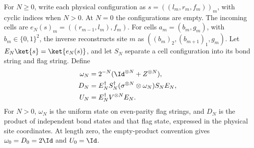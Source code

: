 \begin{definition}%
    \label{def:mpdo_twisted_dimer_bond_flag_regrouping}
    \leanok
    For $N\ge0$, write each physical configuration as
    $s=((l_m,r_m,f_m))_m$, with cyclic indices when $N>0$.
    At $N=0$ the configurations are empty. The incoming cells are
    $e_N(s)_m=((r_{m-1},l_m),f_m)$.
    For cells $a_m=(b_m,g_m)$, with $b_m\in\{0,1\}^2$, the inverse
    reconstructs site $m$ as $((b_m)_2,(b_{m+1})_1,g_m)$.
    Let $E_N\ket{s}=\ket{e_N(s)}$, and let $S_N$ separate a cell
    configuration into its bond string and flag string. Define
    \begin{align}
        \omega_N & =2^{-N}(\Id^{\otimes N}+Z^{\otimes N}),
        \notag                                             \\
        D_N      & =E_N^\dagger S_N^\dagger
        (\sigma^{\otimes N}\otimes\omega_N)S_NE_N,
        \notag                                             \\
        U_N      & =E_N^\dagger V^{\otimes N}E_N.
        \notag
    \end{align}
    For $N>0$, $\omega_N$ is the uniform state on even-parity flag strings,
    and $D_N$ is the product of independent bond states and that flag
    state, expressed in the physical site coordinates.
    At length zero, the empty-product convention gives
    $\omega_0=D_0=2\Id$ and $U_0=\Id$.
\end{definition}

